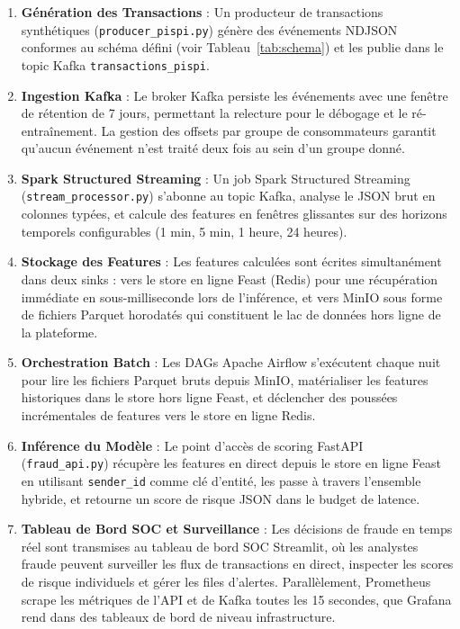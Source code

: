 \documentclass[12pt,a4paper,oneside]{book}
\theoremstyle{definition}
\theoremstyle{plain}
\begin{document}
\begin{enumerate}
  \item \textbf{Génération des Transactions} : Un producteur de transactions synthétiques (\texttt{producer\_pispi.py}) génère des événements NDJSON conformes au schéma défini (voir Tableau~\ref{tab:schema}) et les publie dans le topic Kafka \texttt{transactions\_pispi}.

  \item \textbf{Ingestion Kafka} : Le broker Kafka persiste les événements avec une fenêtre de rétention de 7 jours, permettant la relecture pour le débogage et le ré-entraînement. La gestion des offsets par groupe de consommateurs garantit qu'aucun événement n'est traité deux fois au sein d'un groupe donné.

  \item \textbf{Spark Structured Streaming} : Un job Spark Structured Streaming (\texttt{stream\_processor.py}) s'abonne au topic Kafka, analyse le JSON brut en colonnes typées, et calcule des features en fenêtres glissantes sur des horizons temporels configurables (1 min, 5 min, 1 heure, 24 heures).

  \item \textbf{Stockage des Features} : Les features calculées sont écrites simultanément dans deux sinks : vers le store en ligne Feast (Redis) pour une récupération immédiate en sous-milliseconde lors de l'inférence, et vers MinIO sous forme de fichiers Parquet horodatés qui constituent le lac de données hors ligne de la plateforme.

  \item \textbf{Orchestration Batch} : Les DAGs Apache Airflow s'exécutent chaque nuit pour lire les fichiers Parquet bruts depuis MinIO, matérialiser les features historiques dans le store hors ligne Feast, et déclencher des poussées incrémentales de features vers le store en ligne Redis.

  \item \textbf{Inférence du Modèle} : Le point d'accès de scoring FastAPI (\texttt{fraud\_api.py}) récupère les features en direct depuis le store en ligne Feast en utilisant \texttt{sender\_id} comme clé d'entité, les passe à travers l'ensemble hybride, et retourne un score de risque JSON dans le budget de latence.

  \item \textbf{Tableau de Bord SOC et Surveillance} : Les décisions de fraude en temps réel sont transmises au tableau de bord SOC Streamlit, où les analystes fraude peuvent surveiller les flux de transactions en direct, inspecter les scores de risque individuels et gérer les files d'alertes. Parallèlement, Prometheus scrape les métriques de l'API et de Kafka toutes les 15 secondes, que Grafana rend dans des tableaux de bord de niveau infrastructure.
\end{enumerate}
\end{document}
